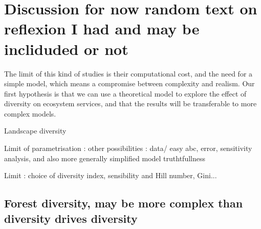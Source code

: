 \documentclass{article}
\begin{document}
\section{Discussion for now random text on reflexion I had and may be incliduded or not}

The limit of this kind of studies is their computational cost, and the need for a simple model, which means a compromise between complexity and realism. Our first hypothesis is that we can use a theoretical model to explore the effect of diversity on ecosystem services, and that the results will be transferable to more complex models.

Landscape diversity

Limit of parametrisation : other possibilities : data/ easy abc, error, sensitivity analysis, and also more generally simplified model truthtfullness

Limit : choice of diversity index, sensibility and Hill number, Gini...

\subsection{Forest diversity, may be more complex than diversity drives diversity}
\end{document}

